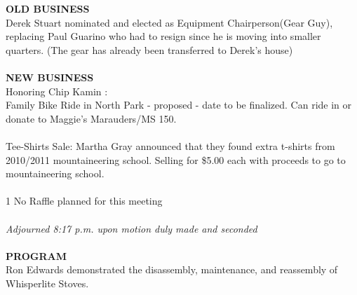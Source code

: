 \documentclass[10pt,a4paper]{article}
\begin{document}
\begin{multicols}{2}
\textbf{OLD BUSINESS}\\
Derek Stuart nominated and elected as Equipment Chairperson(Gear Guy), replacing Paul Guarino who had to resign since he is moving into smaller quarters. (The gear has already been transferred to Derek's house)
\\
\\
\textbf{NEW BUSINESS}\\
Honoring Chip Kamin :   \\
Family Bike Ride in North Park - proposed - date to be finalized. Can ride in or donate to Maggie's Marauders/MS 150.\\
\\
Tee-Shirts Sale: Martha Gray announced that they found extra t-shirts from 2010/2011 mountaineering school. Selling for \$5.00 each with proceeds to go to mountaineering school.\\\\1
No Raffle planned for this meeting\\
\\
\textit{Adjourned  8:17 p.m. upon motion duly made and seconded}
\\
\\
\textbf{PROGRAM}\\
Ron Edwards demonstrated the disassembly, maintenance, and reassembly of Whisperlite Stoves.


\end{multicols}
\end{document}
